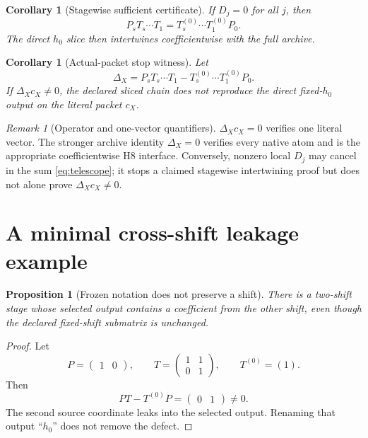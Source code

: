 \documentclass[11pt]{article}
\newtheorem{proposition}[theorem]{Proposition}
\newtheorem{corollary}[theorem]{Corollary}
\theoremstyle{definition}
\theoremstyle{remark}
\newtheorem{remark}[theorem]{Remark}
\begin{document}
\begin{corollary}[Stagewise sufficient certificate]
\label{cor:stagewise}
If \(D_j=0\) for all \(j\), then
\[
 P_sT_s\cdots T_1
 =
 T_s^{(0)}\cdots T_1^{(0)}P_0.
\]
The direct \(h_0\) slice then intertwines coefficientwise with the
full archive.
\end{corollary}

\begin{corollary}[Actual-packet stop witness]
\label{cor:packet}
Let
\[
 \Delta_X=
 P_sT_s\cdots T_1
 -
 T_s^{(0)}\cdots T_1^{(0)}P_0.
\]
If \(\Delta_Xc_X\ne0\), the declared sliced chain does not reproduce
the direct fixed-\(h_0\) output on the literal packet \(c_X\).
\end{corollary}

\begin{remark}[Operator and one-vector quantifiers]
\(\Delta_Xc_X=0\) verifies one literal vector.  The stronger archive
identity \(\Delta_X=0\) verifies every native atom and is the
appropriate coefficientwise H8 interface.  Conversely, nonzero local
\(D_j\) may cancel in the sum \eqref{eq:telescope}; it stops a claimed
stagewise intertwining proof but does not alone prove
\(\Delta_Xc_X\ne0\).
\end{remark}

\section{A minimal cross-shift leakage example}

\begin{proposition}[Frozen notation does not preserve a shift]
\label{prop:leak}
There is a two-shift stage whose selected output contains a
coefficient from the other shift, even though the declared
fixed-shift submatrix is unchanged.
\end{proposition}

\begin{proof}
Let
\[
 P=\begin{pmatrix}1&0\end{pmatrix},\qquad
 T=\begin{pmatrix}1&1\\0&1\end{pmatrix},\qquad
 T^{(0)}=(1).
\]
Then
\[
 PT-T^{(0)}P=\begin{pmatrix}0&1\end{pmatrix}\ne0.
\]
The second source coordinate leaks into the selected output.  Renaming
that output ``\(h_0\)'' does not remove the defect.
\end{proof}
\end{document}
